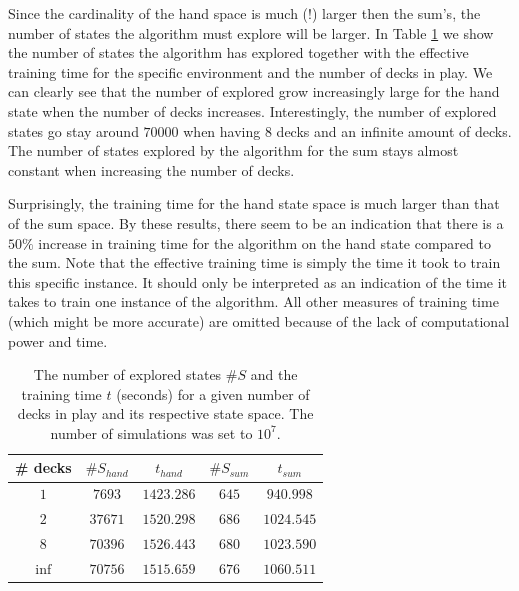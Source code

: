 Since the cardinality of the hand space is much (!) larger then the sum's, the number of states the algorithm must explore will be larger. In Table \ref{tab:state_visited} we show the number of states the algorithm has explored together with the effective training time for the specific environment and the number of decks in play. We can clearly see that the number of explored grow increasingly large for the hand state when the number of decks increases. Interestingly, the number of explored states go stay around $70 000$ when having 8 decks and an infinite amount of decks. The number of states explored by the algorithm for the sum stays almost constant when increasing the number of decks.

Surprisingly, the training time for the hand state space is much larger than that of the sum space. By these results, there seem to be an indication that there is a $50\%$ increase in training time for the algorithm on the hand state compared to the sum. Note that the effective training time is simply the time it took to train this specific instance. It should only be interpreted as an indication of the time it takes to train one instance of the algorithm. All other measures of training time (which might be more accurate) are omitted because of the lack of computational power and time.
\begin{table}[h!]
\centering
 \begin{tabular}{c|cc|cc}
  \# decks & $\#S_{hand}$ & $t_{hand}$ & $\#S_{sum}$ &  $t_{sum}$  \\
  \hline 
  $1$ & $7693$ & $1423.286$ & $645$ & $940.998$ \\
  $2$ & $37671$ & $1520.298$ & $686$ & $1024.545$ \\
  $8$ & $70396$ & $1526.443$ & $680$ & $1023.590$ \\
  $\inf$ & $70756$ & $1515.659$ & $676$ & $1060.511$ 
 \end{tabular} 
 \caption{The number of explored states $\#S$ and the training time $t$ (seconds) for a given number of decks in play and its respective state space. The number of simulations was set to $10^7$.\label{tab:state_visited}}
\end{table}

